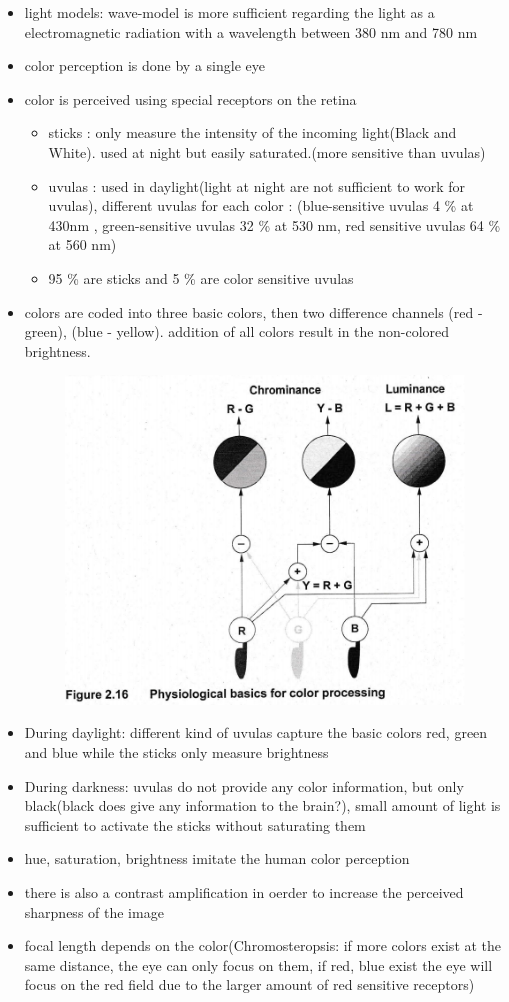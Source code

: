 \documentclass{standalone}
\begin{document}
\begin{itemize}
	\item light models: wave-model is more sufficient regarding the light as a electromagnetic radiation with a wavelength between 380 nm and 780 nm
	\item color perception is done by a single eye
	\item color is perceived using special receptors on the retina
	\begin{itemize}
		\item sticks : only measure the intensity of the incoming light(Black and White). used at night but easily saturated.(more sensitive than uvulas)
		\item uvulas : used in daylight(light at night are not sufficient to work for uvulas), different uvulas for each color : (blue-sensitive uvulas 4 \% at 430nm , green-sensitive uvulas 32 \% at 530 nm, red sensitive uvulas 64 \% at 560 nm)
		\item 95 \% are sticks and 5 \% are color sensitive uvulas
	\end{itemize}
	\item colors are coded into three basic colors, then two difference channels (red - green), (blue - yellow). addition of all colors result in the non-colored brightness.
		\begin{figure}[H]
			\centering
			\includegraphics[width = 0.5\linewidth]{Figures/2_16.png}
		\end{figure}
\item During daylight: different kind of uvulas capture the basic colors red, green and blue while the sticks only measure brightness
\item During darkness: uvulas do not provide any color information, but only black(black does give any information to the brain?), small amount of light is sufficient to activate the sticks without saturating them
\item hue, saturation, brightness imitate the human color perception
\item there is also a contrast amplification in oerder to increase the perceived sharpness of the image
\item focal length depends on the color(Chromosteropsis: if more colors exist at the same distance, the eye can only focus on them, if red, blue exist the eye will focus on the red field due to the larger amount of red sensitive receptors)
\end{itemize}
\end{document}
